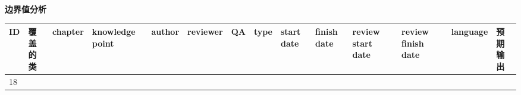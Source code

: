\documentclass[hyperref, a4paper]{ctexart}
\begin{document}
\textbf{边界值分析}

\begin{longtable}[]{@{}llllllllllllll@{}}
\toprule
\begin{minipage}[b]{0.02\columnwidth}\raggedright
ID\strut
\end{minipage} & \begin{minipage}[b]{0.05\columnwidth}\raggedright
覆盖的类\strut
\end{minipage} & \begin{minipage}[b]{0.03\columnwidth}\raggedright
chapter\strut
\end{minipage} & \begin{minipage}[b]{0.07\columnwidth}\raggedright
knowledge point\strut
\end{minipage} & \begin{minipage}[b]{0.04\columnwidth}\raggedright
author\strut
\end{minipage} & \begin{minipage}[b]{0.04\columnwidth}\raggedright
reviewer\strut
\end{minipage} & \begin{minipage}[b]{0.04\columnwidth}\raggedright
QA\strut
\end{minipage} & \begin{minipage}[b]{0.03\columnwidth}\raggedright
type\strut
\end{minipage} & \begin{minipage}[b]{0.05\columnwidth}\raggedright
start date\strut
\end{minipage} & \begin{minipage}[b]{0.05\columnwidth}\raggedright
finish date\strut
\end{minipage} & \begin{minipage}[b]{0.08\columnwidth}\raggedright
review start date\strut
\end{minipage} & \begin{minipage}[b]{0.08\columnwidth}\raggedright
review finish date\strut
\end{minipage} & \begin{minipage}[b]{0.04\columnwidth}\raggedright
language\strut
\end{minipage} & \begin{minipage}[b]{0.02\columnwidth}\raggedright
预期输出\strut
\end{minipage}\tabularnewline
\midrule
\endhead
\begin{minipage}[t]{0.02\columnwidth}\raggedright
18\strut
\end{minipage} & \begin{minipage}[t]{0.05\columnwidth}\raggedright

\end{minipage}
\end{longtable}
\end{document}
